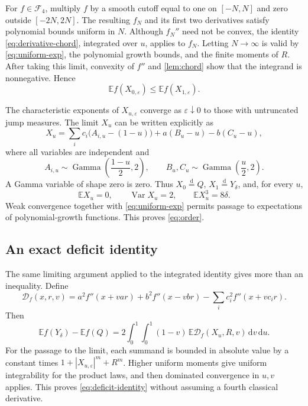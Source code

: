 \documentclass[11pt]{article}
\numberwithin{equation}{section}
\theoremstyle{definition}
\theoremstyle{remark}
\newcommand{\E}{\mathbb E}
\newcommand{\Var}{\operatorname{Var}}
\newcommand{\dd}{\,\mathrm d}
\newcommand{\eqd}{\overset{\mathrm d}=}
\newcommand{\fourth}{\mathcal F_4}
\DeclareMathOperator{\GammaDist}{Gamma}
\begin{document}
For $f\in\fourth$, multiply $f$ by a smooth cutoff equal to one on $[-N,N]$ and zero outside $[-2N,2N]$. The resulting $f_N$ and its first two derivatives satisfy polynomial bounds uniform in $N$. Although $f_N''$ need not be convex, the identity \eqref{eq:derivative-chord}, integrated over $u$, applies to $f_N$. Letting $N\to\infty$ is valid by \eqref{eq:uniform-exp}, the polynomial growth bounds, and the finite moments of $R$. After taking this limit, convexity of $f''$ and \cref{lem:chord} show that the integrand is nonnegative. Hence
\[
\E f(X_{0,\varepsilon})\leq\E f(X_{1,\varepsilon}).
\]

The characteristic exponents of $X_{u,\varepsilon}$ converge as $\varepsilon\downarrow0$ to those with untruncated jump measures. The limit $X_u$ can be written explicitly as
\begin{equation}\label{eq:interpolant}
X_u=\sum_i c_i\bigl(A_{i,u}-(1-u)\bigr)
+a(B_u-u)-b(C_u-u),
\end{equation}
where all variables are independent and
\[
A_{i,u}\sim\GammaDist\!\left(\frac{1-u}{2},2\right),\qquad
B_u,C_u\sim\GammaDist\!\left(\frac u2,2\right).
\]
A Gamma variable of shape zero is zero. Thus $X_0\eqd Q$, $X_1\eqd Y_\delta$, and, for every $u$,
\begin{equation}\label{eq:interpolant-moments}
\E X_u=0,\qquad \Var X_u=2,\qquad \E X_u^3=8\delta.
\end{equation}
Weak convergence together with \eqref{eq:uniform-exp} permits passage to expectations of polynomial-growth functions. This proves \eqref{eq:order}.

\subsection{An exact deficit identity}
The same limiting argument applied to the integrated identity gives more than an inequality. Define
\begin{equation}\label{eq:chord-gap-definition}
\mathcal D_f(x,r,v)=a^2f''(x+var)+b^2f''(x-vbr)
-\sum_i c_i^2f''(x+vc_ir).
\end{equation}
Then
\begin{equation}\label{eq:deficit-identity}
\boxed{\quad
\E f(Y_\delta)-\E f(Q)
=2\int_0^1\int_0^1(1-v)\,
\E\mathcal D_f(X_u,R,v)\dd v\dd u.
\quad}
\end{equation}
For the passage to the limit, each summand is bounded in absolute value by a constant times $1+|X_{u,\varepsilon}|^m+R^m$. Higher uniform moments give uniform integrability for the product laws, and then dominated convergence in $u,v$ applies. This proves \eqref{eq:deficit-identity} without assuming a fourth classical derivative.
\end{document}
